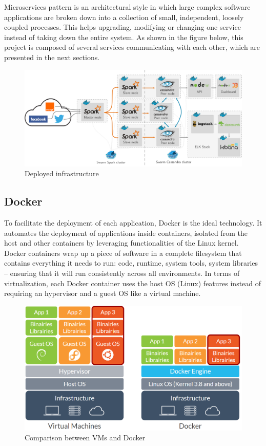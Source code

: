 \documentclass[11pt]{article}
\begin{document}

Microservices pattern is an architectural style in which large complex software applications are broken down into a collection of small, independent, loosely coupled processes. This helps upgrading, modifying or changing one service instead of taking down the entire system. As shown in the figure below, this project is composed of several services communicating with each other, which are presented in the next sections.

\begin{figure}[h!]
    \centering
    \includegraphics[scale=0.15]{img/archi.png}
    \caption{Deployed infrastructure}
    \label{infra}
\end{figure}

\subsection{Docker}

To facilitate the deployment of each application, Docker is the ideal technology. It automates the deployment of applications inside containers, isolated from the host and other containers by leveraging functionalities of the Linux kernel. Docker containers wrap up a piece of software in a complete filesystem that contains everything it needs to run: code, runtime, system tools, system libraries – ensuring that it will run consistently across all environments. In terms of virtualization, each Docker container uses the host OS (Linux) features instead of requiring an hypervisor and a guest OS like a virtual machine.

\begin{figure}[h!]
    \centering
    \includegraphics[scale=0.3]{img/docker-vs-vm.png}
    \caption{Comparison between VMs and Docker}
    \label{docker-vs-vm}
\end{figure}
\end{document}
